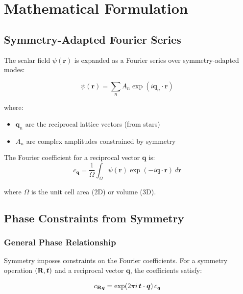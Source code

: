 \chapter{Mathematical Formulation}

\section{Symmetry-Adapted Fourier Series}

The scalar field $\psi(\boldsymbol{r})$ is expanded as a Fourier series over symmetry-adapted modes:

\begin{equation}
    \psi(\boldsymbol{r}) = \sum_{n} A_n \exp(i \boldsymbol{q}_n \cdot \boldsymbol{r})
\end{equation}

where:
\begin{itemize}
    \item $\boldsymbol{q}_n$ are the reciprocal lattice vectors (from stars)
    \item $A_n$ are complex amplitudes constrained by symmetry
\end{itemize}

The Fourier coefficient for a reciprocal vector $\boldsymbol{q}$ is:
\begin{equation}
    c_{\boldsymbol{q}} = \frac{1}{\Omega} \int_{\Omega} \psi(\boldsymbol{r}) \exp(-i \boldsymbol{q} \cdot \boldsymbol{r}) \, d\boldsymbol{r}
\end{equation}

where $\Omega$ is the unit cell area (2D) or volume (3D).

\section{Phase Constraints from Symmetry}

\subsection{General Phase Relationship}

Symmetry imposes constraints on the Fourier coefficients. For a symmetry operation $(\mathbf{R}, \boldsymbol{t})$ and a reciprocal vector $\boldsymbol{q}$, the coefficients satisfy:

\begin{equation}
    c_{\mathbf{R} \boldsymbol{q}} = \exp(2\pi i \, \boldsymbol{t} \cdot \boldsymbol{q}) \, c_{\boldsymbol{q}}
\end{equation}

